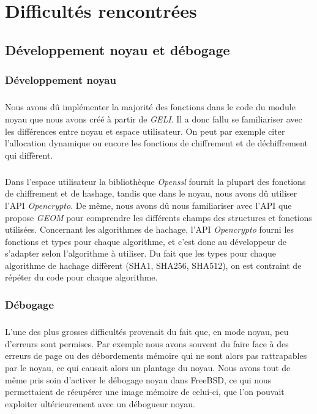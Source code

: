 \chapter{Difficultés rencontrées}

\section{Développement noyau et débogage}

\subsection{Développement noyau}

\paragraph{}Nous avons dû implémenter la majorité des fonctions dans le code du
module noyau que nous avons créé à partir de {\em GELI}. Il a donc fallu se
familiariser avec les différences entre noyau et espace utilisateur. On peut
par exemple citer l'allocation dynamique ou encore les fonctions de chiffrement
et de déchiffrement qui diffèrent.

\paragraph{}
Dans l'espace utilisateur la bibliothèque {\em Openssl} fournit la plupart des
fonctions de chiffrement et de hashage, tandis que dans le noyau, nous avons dû
utiliser l'API {\em Opencrypto}. De même, nous avons dû nous familiariser avec
l'API que propose {\em GEOM} pour comprendre les différents champs des
structures et fonctions utilisées. Concernant les algorithmes de hachage, l'API
{\em Opencrypto} fourni les fonctions et types pour chaque algorithme, et c'est
donc au développeur de s'adapter selon l'algorithme à utiliser. Du fait que
les types pour chaque algorithme de hachage diffèrent (SHA1, SHA256, SHA512),
on est contraint de répéter du code pour chaque algorithme.

\subsection{Débogage}
\paragraph{}
L'une des plus grosses difficultés provenait du fait que, en mode noyau,
peu d'erreurs sont permises. Par exemple nous avons souvent du faire face à
des erreurs de page ou des débordements mémoire qui ne sont alors pas
rattrapables par le noyau, ce qui causait alors un plantage du noyau. Nous avons
tout de même pris soin d'activer le débogage noyau dans FreeBSD, ce qui nous
permettaient de récupérer une image mémoire de celui-ci, que l'on pouvait
exploiter ultérieurement avec un débogueur noyau.


